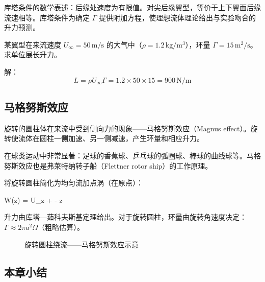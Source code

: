 库塔条件的数学表述：后缘处速度为有限值。对尖后缘翼型，等价于上下翼面后缘流速相等。库塔条件为确定 \(\Gamma\) 提供附加方程，使理想流体理论给出与实验吻合的升力预测。

\begin{example}
某翼型在来流速度 \(U_\infty = 50\,\text{m}/\text{s}\) 的大气中（\(\rho = 1.2\,\text{kg}/\text{m}^3\)），环量 \(\Gamma = 15\,\text{m}^2/\text{s}\)。求单位展长升力。

解：
\[
L = \rho U_\infty \Gamma = 1.2 \times 50 \times 15 = 900\,\text{N}/\text{m}
\]
\end{example}

\subsection{马格努斯效应}

旋转的圆柱体在来流中受到侧向力的现象——马格努斯效应（Magnus effect）。旋转使流体在圆柱一侧加速、另一侧减速，产生环量和相应升力。

在球类运动中非常显著：足球的香蕉球、乒乓球的弧圈球、棒球的曲线球等。马格努斯效应也是弗莱特纳转子船（Flettner rotor ship）的工作原理。

将旋转圆柱简化为均匀流加点涡（在原点）：
\begin{myformula}
W(z) = U_\infty z +  - \ln z
\end{myformula}

升力由库塔—茹科夫斯基定理给出。对于旋转圆柱，环量由旋转角速度决定：\(\Gamma \approx 2\pi a^2\Omega\)（粗略估算）。

\begin{figure}[H]
\centering
{}
\caption{旋转圆柱绕流——马格努斯效应示意}
\label{fig:magnus}
\end{figure}

\subsection{本章小结}

